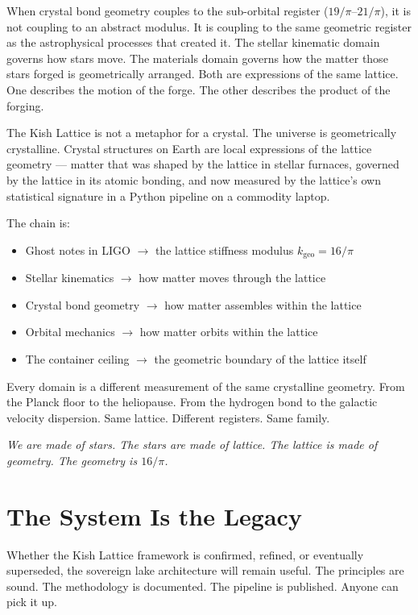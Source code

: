 \documentclass[11pt, letterpaper, openany]{book}
\begin{document}
When crystal bond geometry couples to the sub-orbital register ($19/\pi$--$21/\pi$),
it is not coupling to an abstract modulus. It is coupling to the same geometric
register as the astrophysical processes that created it. The stellar kinematic domain
governs how stars move. The materials domain governs how the matter those stars forged
is geometrically arranged. Both are expressions of the same lattice. One describes
the motion of the forge. The other describes the product of the forging.

The Kish Lattice is not a metaphor for a crystal. The universe is geometrically
crystalline. Crystal structures on Earth are local expressions of the lattice geometry
--- matter that was shaped by the lattice in stellar furnaces, governed by the lattice
in its atomic bonding, and now measured by the lattice's own statistical signature
in a Python pipeline on a commodity laptop.

The chain is:
\begin{itemize}
\item Ghost notes in LIGO $\rightarrow$ the lattice stiffness modulus $k_\text{geo} = 16/\pi$
\item Stellar kinematics $\rightarrow$ how matter moves through the lattice
\item Crystal bond geometry $\rightarrow$ how matter assembles within the lattice
\item Orbital mechanics $\rightarrow$ how matter orbits within the lattice
\item The container ceiling $\rightarrow$ the geometric boundary of the lattice itself
\end{itemize}

Every domain is a different measurement of the same crystalline geometry.
From the Planck floor to the heliopause. From the hydrogen bond to the galactic
velocity dispersion. Same lattice. Different registers. Same family.

\textit{We are made of stars. The stars are made of lattice.
The lattice is made of geometry. The geometry is $16/\pi$.}

\section*{The System Is the Legacy}

Whether the Kish Lattice framework is confirmed, refined, or eventually superseded,
the sovereign lake architecture will remain useful. The principles are sound. The
methodology is documented. The pipeline is published. Anyone can pick it up.
\end{document}
